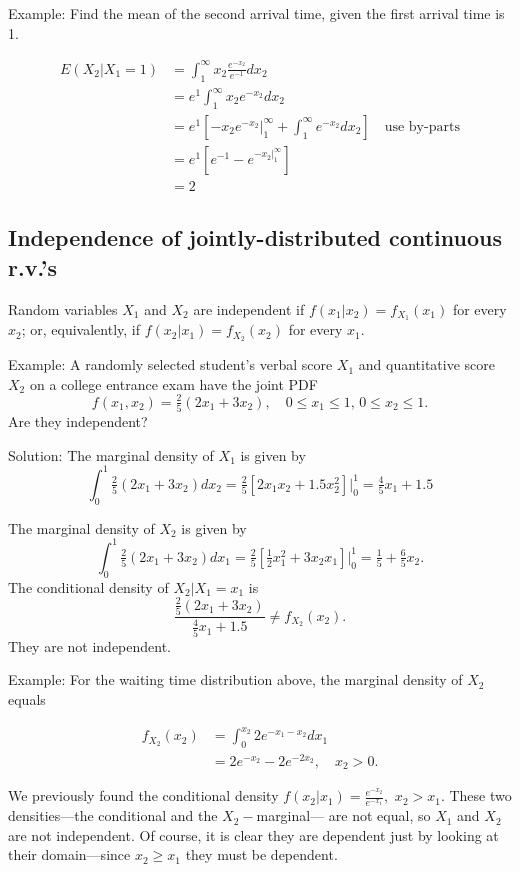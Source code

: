\documentclass[]{book}
\begin{document}
Example: Find the mean of the second arrival time, given the first
arrival time is 1.

\begin{align*}
E(X_2|X_1=1) &= \int_{1}^\infty x_2\frac{e^{-x_2}}{e^{-1}}dx_2\\
& = e^{1}\int_{1}^\infty x_2e^{-x_2}dx_2\\
& = e^1[-x_2e^{-x_2}|_1^\infty + \int_1^\infty e^{-x_2}dx_2] \quad \text{use by-parts}\\
& = e^1[e^{-1} - e^{-x_2|_1^\infty}]\\
& = 2
\end{align*}

\subsection{Independence of jointly-distributed continuous
r.v.'s}\label{independence-of-jointly-distributed-continuous-r.v.s}

Random variables \(X_1\) and \(X_2\) are independent if
\(f(x_1|x_2) = f_{X_1}(x_1)\) for every \(x_2\); or, equivalently, if
\(f(x_2|x_1) = f_{X_2}(x_2)\) for every \(x_1\).

Example: A randomly selected student's verbal score \(X_1\) and
quantitative score \(X_2\) on a college entrance exam have the joint PDF
\[f(x_1, x_2) = \tfrac25 (2x_1+3x_2), \quad 0\leq x_1\leq 1, \, 0\leq x_2\leq 1.\]
Are they independent?

 Solution: The marginal density of \(X_1\) is given by
\[\int_{0}^1 \tfrac25 (2x_1+3x_2)dx_2 = \tfrac25[2x_1x_2+1.5x_2^2]|_0^1 = \tfrac45 x_1 + 1.5\]

The marginal density of \(X_2\) is given by
\[\int_{0}^1 \tfrac25 (2x_1+3x_2)dx_1 = \tfrac25[\tfrac12x_1^2+3x_2x_1]|_0^1 = \tfrac15  + \tfrac65 x_2.\]
The conditional density of \(X_2|X_1=x_1\) is
\[\frac{\tfrac25(2x_1+3x_2)}{\tfrac45 x_1+1.5} \ne f_{X_2}(x_2).\] They
are not independent.

Example: For the waiting time distribution above, the marginal density
of \(X_2\) equals

\begin{align*}
f_{X_2}(x_2) &= \int_0^{x_2} 2e^{-x_1-x_2}dx_1\\
& = 2e^{-x_2} - 2e^{-2x_2}, \quad x_2>0.
\end{align*}

We previously found the conditional density
\(f(x_2|x_1) = \frac{e^{-x_2}}{e^{-x_1}}, \,\,x_2>x_1\). These two
densities---the conditional and the \(X_2-\)marginal--- are not equal,
so \(X_1\) and \(X_2\) are not independent. Of course, it is clear they
are dependent just by looking at their domain---since \(x_2\geq x_1\)
they must be dependent.
\end{document}
